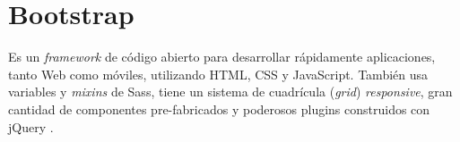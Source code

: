 \section{Bootstrap}

Es un \textit{framework} de código abierto para desarrollar rápidamente
aplicaciones, tanto Web como móviles, utilizando HTML, CSS y JavaScript.
También usa variables y \textit{mixins} de Sass, tiene un sistema de cuadrícula
(\textit{grid}) \textit{responsive}, gran cantidad de componentes pre-fabricados y poderosos plugins construidos con jQuery \cite{Bootstrap}.
